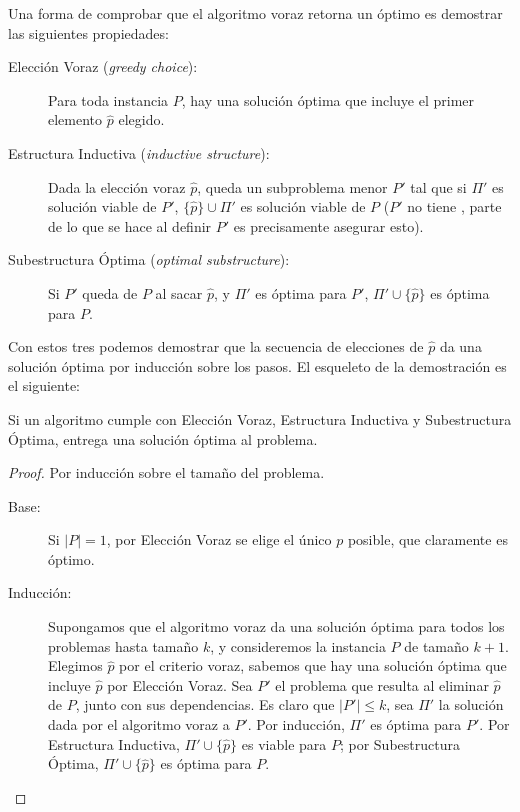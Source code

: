   Una forma de comprobar que el algoritmo voraz retorna un óptimo
  es demostrar las siguientes propiedades:
  \begin{description}
  \item[Elección Voraz
        (\emph{\foreignlanguage{english}{greedy choice}}):]
    Para toda instancia \(P\), hay una solución óptima
    que incluye el primer elemento \(\widehat p\) elegido.
  \item[Estructura Inductiva
        (\emph{\foreignlanguage{english}{inductive structure}}):]
    Dada la elección voraz \(\widehat{p}\),
    queda un subproblema menor \(P'\)
    tal que si \(\Pi'\) es solución viable de \(P'\),
    \(\{ \widehat{p} \} \cup \Pi'\) es solución viable de \(P\)
    (\(P'\) no tiene ,
     parte de lo que se hace al definir \(P'\)
     es precisamente asegurar esto).
  \item[Subestructura Óptima
        (\emph{\foreignlanguage{english}{optimal substructure}}):]
    Si \(P'\) queda de \(P\) al sacar \(\widehat p\),
    y  \(\Pi'\) es óptima para \(P'\),
    \(\Pi' \cup \{ \widehat{p} \}\) es óptima para \(P\).
  \end{description}
  Con estos tres podemos demostrar
  que la secuencia de elecciones de \(\widehat{p}\)
  da una solución óptima por inducción sobre los pasos.
  El esqueleto de la demostración es el siguiente:
  \begin{theorem}
    \label{theo:esquema-voraz}
    Si un algoritmo cumple con Elección Voraz, Estructura Inductiva
    y Subestructura Óptima,
    entrega una solución óptima al problema.
  \end{theorem}
  \begin{proof}
    Por inducción sobre el tamaño del problema.
    \begin{description}
    \item[Base:]
      Si \(\lvert P \rvert = 1\),
      por Elección Voraz se elige el único \(p\) posible,
      que claramente es óptimo.
    \item[Inducción:]
      Supongamos que el algoritmo voraz da una solución óptima
      para todos los problemas hasta tamaño \(k\),
      y consideremos la instancia \(P\) de tamaño \(k + 1\).
      Elegimos \(\widehat{p}\) por el criterio voraz,
      sabemos que hay una solución óptima que incluye \(\widehat{p}\)
      por Elección Voraz.
      Sea \(P'\) el problema
      que resulta al eliminar \(\widehat{p}\) de \(P\),
      junto con sus dependencias.
      Es claro que \(\lvert P' \rvert \le k\),
      sea \(\Pi'\) la solución dada por el algoritmo voraz a \(P'\).
      Por inducción,
      \(\Pi'\) es óptima para \(P'\).
      Por Estructura Inductiva,
      \(\Pi' \cup \{ \widehat{p} \}\) es viable para \(P\);
      por Subestructura Óptima,
      \(\Pi' \cup \{ \widehat{p} \}\) es óptima para \(P\).
    \end{description}
  \end{proof}

